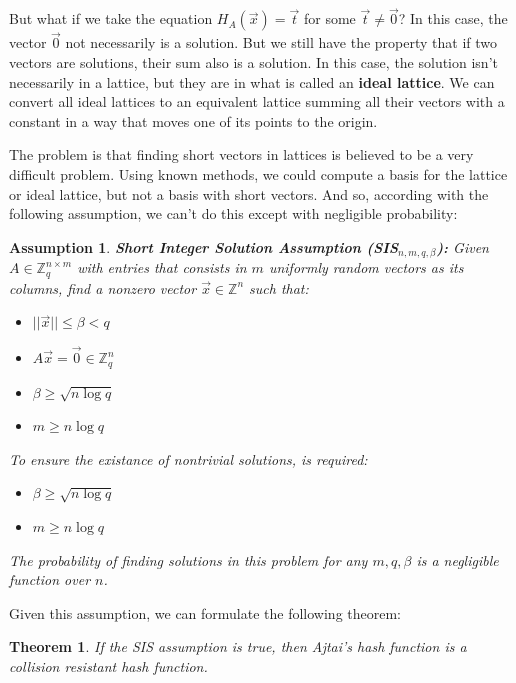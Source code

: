 \documentclass[a4paper]{article}
\newtheorem{theorem}{Theorem}
\newtheorem{assumption}{Assumption}
\begin{document}
But what if we take the equation
$H_A(\overrightarrow{x})=\overrightarrow{t}$ for some
$\overrightarrow{t}\neq\overrightarrow{0}$? In this case, the vector
$\overrightarrow{0}$ not necessarily is a solution. But we still have
the property that if two vectors are solutions, their sum also is a
solution. In this case, the solution isn't necessarily in a lattice,
but they are in what is called an \textbf{ideal lattice}. We can
convert all ideal lattices to an equivalent lattice summing all their
vectors with a constant in a way that moves one of its points to the
origin.

The problem is that finding short vectors in lattices is believed to
be a very difficult problem. Using known methods, we could compute a
basis for the lattice or ideal lattice, but not a basis with short
vectors. And so, according with the following assumption, we can't do
this except with negligible probability:

\begin{assumption}
\textbf{Short Integer Solution Assumption (SIS$_{n, m, q, \beta}$):
}Given $A \in \mathbb{Z}_q^{n \times m}$ with entries that consists in
$m$ uniformly random vectors as its columns, find a nonzero vector
$\overrightarrow{x} \in \mathbb{Z}^n$ such that:

\begin{itemize}
    \item $||\overrightarrow{x}||\leq \beta < q$
    \item $A\overrightarrow{x}=\overrightarrow{0} \in \mathbb{Z}_q^n$
    \item $\beta \geq \sqrt{n\log q}$
    \item $m \geq n \log q$
\end{itemize}

To ensure the existance of nontrivial solutions, is required:

\begin{itemize}
    \item $\beta \geq \sqrt{n\log q}$
    \item $m \geq n \log q$
\end{itemize}

The probability of finding solutions in this problem for any $m, q,
\beta$ is a negligible function over $n$.
\end{assumption}

Given this assumption, we can formulate the following theorem:

\begin{theorem}
  If the SIS assumption is true, then Ajtai's hash function is a
  collision resistant hash function.
\end{theorem}
\end{document}
